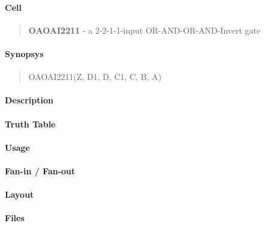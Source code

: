 \label{OAOAI2211}
\paragraph{Cell}
\begin{quote}
    \textbf{OAOAI2211} - a 2-2-1-1-input OR-AND-OR-AND-Invert gate
\end{quote}

\paragraph{Synopsys}
\begin{quote}
    OAOAI2211(Z, D1, D, C1, C, B, A)
\end{quote}

\paragraph{Description}

%

\paragraph{Truth Table}
%

\paragraph{Usage}

\paragraph{Fan-in / Fan-out}

\paragraph{Layout}

\paragraph{Files}
